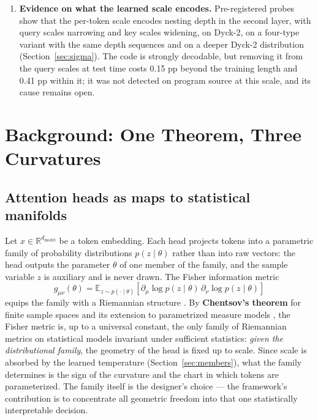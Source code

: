 \documentclass[11pt]{article}
\begin{document}
\begin{enumerate}
\item \textbf{Evidence on what the learned scale encodes.} Pre-registered probes show that the per-token scale encodes nesting depth in the second layer, with query scales narrowing and key scales widening, on Dyck-2, on a four-type variant with the same depth sequences and on a deeper Dyck-2 distribution (Section~\ref{sec:sigma}). The code is strongly decodable, but removing it from the query scales at test time costs 0.15 pp beyond the training length and 0.41 pp within it; it was not detected on program source at this scale, and its cause remains open.
\end{enumerate}

\section{Background: One Theorem, Three Curvatures}\label{sec:background}

\subsection{Attention heads as maps to statistical manifolds}

Let $x \in \mathbb{R}^{d_{\mathrm{model}}}$ be a token embedding. Each head projects tokens into a parametric family of probability distributions $p(z\mid\theta)$ rather than into raw vectors: the head outputs the parameter $\theta$ of one member of the family, and the sample variable $z$ is auxiliary and is never drawn. The Fisher information metric
\begin{equation*}
g_{\mu\nu}(\theta) = \mathbb{E}_{z\sim p(\cdot\mid\theta)}\!\left[\partial_\mu \log p(z\mid\theta)\, \partial_\nu \log p(z\mid\theta)\right]
\end{equation*}
equips the family with a Riemannian structure \cite{amari2016}. By \textbf{Chentsov's theorem} for finite sample spaces \cite{chentsov1972} and its extension to parametrized measure models \cite{ay2015}, the Fisher metric is, up to a universal constant, the only family of Riemannian metrics on statistical models invariant under sufficient statistics: \emph{given the distributional family}, the geometry of the head is fixed up to scale. Since scale is absorbed by the learned temperature (Section~\ref{sec:members}), what the family determines is the sign of the curvature and the chart in which tokens are parameterized. The family itself is the designer's choice --- the framework's contribution is to concentrate all geometric freedom into that one statistically interpretable decision.
\end{document}
